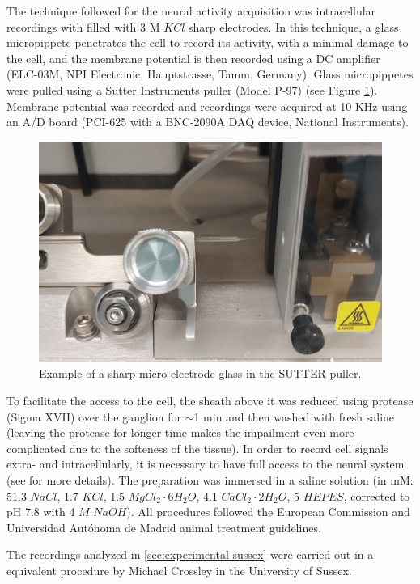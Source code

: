 The technique followed for the neural activity acquisition was intracellular recordings with filled with 3 M $KCl$ sharp electrodes. %
 In this technique, a glass micropippete penetrates the cell to record its activity, with a minimal damage to the cell, and the membrane potential is then recorded using a DC amplifier (ELC-03M, NPI Electronic, Hauptstrasse, Tamm, Germany). Glass micropippetes were pulled using a Sutter Instruments puller (Model P-97) (see Figure \ref{fig:electrode}). Membrane potential was recorded and recordings were acquired at 10 KHz using an A/D board (PCI-625 with a BNC-2090A DAQ device, National Instruments).

\begin{figure}[hbt!]
	\centering
	\includegraphics[width=0.6\linewidth]{img/methods/preparation/electrode4_zoom.jpg}
	\caption{Example of a sharp micro-electrode glass in the SUTTER puller.}
	\label{fig:electrode}
\end{figure}

To facilitate the access to the cell, the sheath above it was reduced using protease (Sigma XVII) over the ganglion for $\sim$1 min and then washed with fresh saline (leaving the protease for longer time makes the impailment even more complicated due to the softeness of the tissue). In order to record cell signals extra- and intracellularly, it is necessary to have full access to the neural system (see \cite{garrido-pena_tfm_2022} for more details). The preparation was immersed in a saline solution (in mM: 51.3 $NaCl$, 1.7 $KCl$, 1.5 $MgCl_2\cdot6H_2O$, 4.1 $CaCl_2\cdot2H_2O$, 5 $HEPES$, corrected to pH 7.8 with 4 $M$ $NaOH$). All procedures followed the European Commission and Universidad Autónoma de Madrid animal treatment guidelines.

The recordings analyzed in \ref{sec:experimental sussex} were carried out in a equivalent procedure by Michael Crossley in the University of Sussex. 



